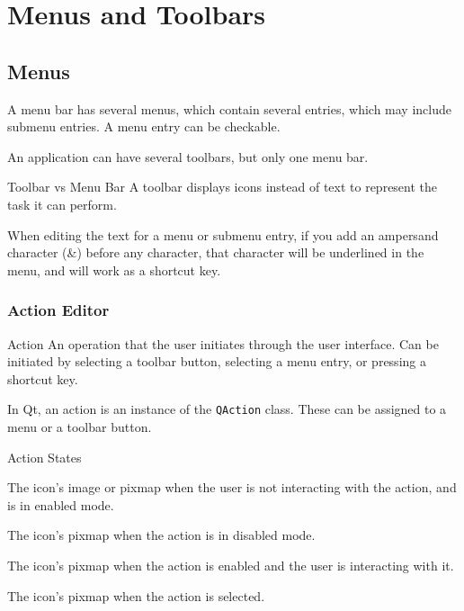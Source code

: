 \documentclass[notes.tex]{subfiles}
\begin{document}
	\setcounter{chapter}{1}
	\chapter{Menus and Toolbars}
		\section{Menus}
			A menu bar has several menus, which contain several entries, which may include submenu entries. A menu entry can be checkable.

			An application can have several toolbars, but only one menu bar.

			\begin{sidenote}{Toolbar vs Menu Bar}
				A toolbar displays icons instead of text to represent the task it can perform.
			\end{sidenote}

			When editing the text for a menu or submenu entry, if you add an ampersand character (\&) before any character, that character will be underlined in the menu, and will work as a shortcut key.

			\subsection{Action Editor}
				\begin{definition}{Action}
					An operation that the user initiates through the user interface. Can be initiated by selecting a toolbar button, selecting a menu entry, or pressing a shortcut key.
				\end{definition}
				In Qt, an action is an instance of the \verb|QAction| class. These can be assigned to a menu or a toolbar button.
				\begin{sidenote}{Action States}
					\begin{description}[nosep]
						\item[Normal] The icon's image or pixmap when the user is not interacting with the action, and is in enabled mode.
						\item[Disabled] The icon's pixmap when the action is in disabled mode.
						\item[Active] The icon's pixmap when the action is enabled and the user is interacting with it.
						\item[Selected] The icon's pixmap when the action is selected.    
					\end{description}
				\end{sidenote}
\end{document}
